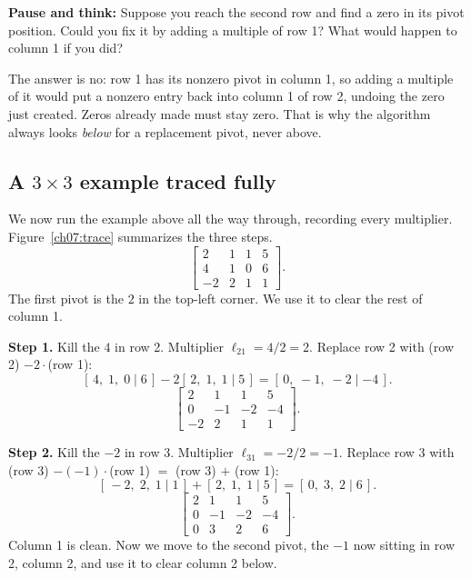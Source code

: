 \begin{recoverybox}
\textbf{Pause and think:} Suppose you reach the second row and find a zero in its pivot position. Could you fix it by adding a multiple of row 1? What would happen to column 1 if you did?
\end{recoverybox}

The answer is no: row 1 has its nonzero pivot in column 1, so adding a multiple of it would put a nonzero entry back into column 1 of row 2, undoing the zero just created. Zeros already made must stay zero. That is why the algorithm always looks \emph{below} for a replacement pivot, never above.

\subsection{A $3\times 3$ example traced fully}

We now run the example above all the way through, recording every multiplier.
Figure~\ref{ch07:trace} summarizes the three steps.
\[
\left[\begin{array}{ccc|c}
2 & 1 & 1 & 5\\
4 & 1 & 0 & 6\\
-2 & 2 & 1 & 1
\end{array}\right].
\]
The first pivot is the $2$ in the top-left corner. We use it to clear the rest of
column 1.

\textbf{Step 1.} Kill the $4$ in row 2. Multiplier $\ell_{21} = 4/2 = 2$.
Replace row 2 with (row 2) $- 2\cdot$(row 1):
\[
[\,4,\;1,\;0\mid 6\,] - 2[\,2,\;1,\;1\mid 5\,]
= [\,0,\;-1,\;-2\mid -4\,].
\]
\[
\left[\begin{array}{ccc|c}
2 & 1 & 1 & 5\\
0 & -1 & -2 & -4\\
-2 & 2 & 1 & 1
\end{array}\right].
\]

\textbf{Step 2.} Kill the $-2$ in row 3. Multiplier $\ell_{31} = -2/2 = -1$.
Replace row 3 with (row 3) $-(-1)\cdot$(row 1) $=$ (row 3) $+$ (row 1):
\[
[\,-2,\;2,\;1\mid 1\,] + [\,2,\;1,\;1\mid 5\,] = [\,0,\;3,\;2\mid 6\,].
\]
\[
\left[\begin{array}{ccc|c}
2 & 1 & 1 & 5\\
0 & -1 & -2 & -4\\
0 & 3 & 2 & 6
\end{array}\right].
\]
Column 1 is clean. Now we move to the second pivot, the $-1$ now sitting in row
2, column 2, and use it to clear column 2 below.

